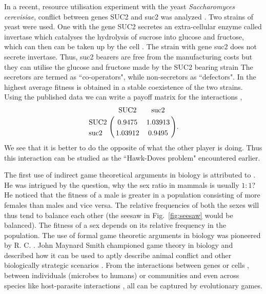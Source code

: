 \documentclass[oneside,11pt,a4paper]{book}
\begin{document}
In a recent, resource utilisation experiment with the yeast \textit{Saccharomyces cerevisiae}, conflict between genes SUC2 and suc2 was analyzed
\citep{maclean:2010ye}.
Two strains of yeast were used.
One with the gene SUC2 secretes an extra-cellular enzyme called invertase which catalyses the hydrolysis of sucrose into glucose and fructose, which can then can be taken up by the cell \citep{greig:2004aa,doebeli:2005aa,gore:2009na}.
The strain with gene suc2 does not secrete invertase.
Thus, suc2 bearers are free from the manufacturing costs but they can utilise the glucose and fructose made by the SUC2 bearing strain
The secretors are termed as ``co-operators", while
non-secretors as ``defectors". 
In \citet{maclean:2010ye} the highest average fitness is obtained in a stable coexistence of the two strains.
Using the published data we can write a payoff matrix for the interactions \citep{wu:2011pr},
%
\begin{eqnarray}
\bordermatrix{
 & \text{SUC2} & \text{suc2} \cr
\text{SUC2} & 0.9475 & 1.03913 \cr
\text{suc2} & 1.03912 & 0.9495 \cr}.
\label{duncan:FitnessMatrix}
\end{eqnarray}
%
We see that it is better to do the opposite of what the other player is doing.
Thus this interaction can be studied as the ``Hawk-Doves problem" encountered earlier.


The first use of indirect game theoretical arguments in biology is attributed to \citet{fisher:1930fi}.
He was intrigued by the question, why the sex ratio in mammals is usually $1:1$?
He noticed that the fitness of a male is greater in a population consisting of more females than males and vice versa.
The relative frequencies of both the sexes will thus tend to balance each other (the seesaw in Fig.\ \ref{fig:seesaw} would be balanced).
The fitness of a sex depends on its relative frequency in the population.
The use of formal game theoretic arguments in biology was pioneered by R. C. \citet{lewontin:1961to}.
John Maynard Smith championed game theory in biology and described how it can be used to aptly describe animal conflict and other biologically strategic scenarios \citep{maynard-smith:1973to,maynard-smith:1982to}.
From the interactions between genes or cells \citep{axelrod:2006pn,basanta:2008cp}, between individuals (microbes to humans) or communities \citep{axelrod:1984yo,turner:1999hp,archetti:2000aa,turner:2005aa,frey:2010aa} and even across species like host-parasite interactions \citep{vickery:2010aa}, all can be captured by evolutionary games.
\end{document}
